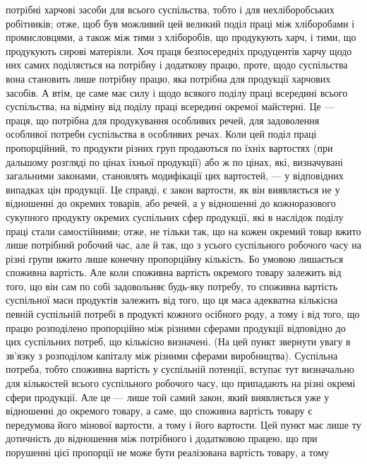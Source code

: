 \parcont{}  %
потрібні харчові засоби для всього суспільства, тобто і для нехліборобських робітників;
отже, щоб був можливий цей великий поділ праці між хліборобами
і промисловцями, а також між тими з хліборобів, що продукують харч, і тими,
що продукують сирові матеріяли. Хоч праця безпосередніх продуцентів харчу
щодо них самих поділяється на потрібну і додаткову працю, проте, щодо
суспільства вона становить лише потрібну працю, яка потрібна для продукції
харчових засобів. А втім, це саме має силу і щодо всякого поділу праці
всередині всього суспільства, на відміну від поділу праці всередині окремої майстерні.
Це — праця, що потрібна для продукування особливих речей, для задоволення
особливої потреби суспільства в особливих речах. Коли цей поділ праці
пропорційний, то продукти різних груп продаються по їхніх вартостях (при
дальшому розгляді по цінах їхньої продукції) або ж по цінах, які, визначувані
загальними законами, становлять модифікації цих вартостей, — у відповідних
випадках цін продукції. Це справді, є закон вартости, як він виявляється не
у відношенні до окремих товарів, або речей, а у відношенні до кожноразового
сукупного продукту окремих суспільних сфер продукції, які в наслідок поділу
праці стали самостійними; отже, не тільки так, що на кожен окремий товар вжито
лише потрібний робочий час, але й так, що з усього суспільного робочого часу
на різні групи вжито лише конечну пропорційну кількість. Бо умовою лишається
споживна вартість. Але коли споживна вартість окремого товару залежить
від того, що він сам по собі задовольняє будь-яку потребу, то споживна вартість
суспільної маси продуктів залежить від того, що ця маса адекватна кількісна
певній суспільній потребі в продукті кожного осібного роду, а тому і від того,
що працю розподілено пропорційно між різними сферами продукції відповідно
до цих суспільних потреб, що кількісно визначені. (На цей пункт звернути
увагу в зв’язку з розподілом капіталу між різними сферами виробництва). Суспільна
потреба, тобто споживна вартість у суспільній потенції, вступає тут визначально
для кількостей всього суспільного робочого часу, що припадають на
різні окремі сфери продукції. Але це — лише той самий закон, який виявляється
уже у відношенні до окремого товару, а саме, що споживна вартість товару
є передумова його мінової вартости, а тому і його вартости. Цей пункт має
лише ту дотичність до відношення між потрібного і додатковою працею, що при
порушенні цієї пропорції не може бути реалізована вартість товару, а тому
